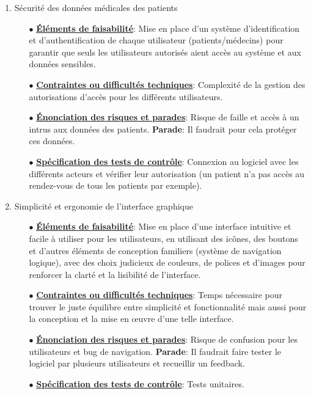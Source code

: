 \documentclass[a4paper]{book}
\begin{document}
\begin{enumerate}
    \item Sécurité des données médicales des patients\newline
    \begin{itemize}
        \item[$\bullet$] \textbf{\underline{Éléments de faisabilité}}: Mise en place d’un système d’identification et d’authentification de chaque utilisateur (patients/médecins) pour garantir que seuls les utilisateurs autorisés aient accès au système et aux données sensibles.
        \item[$\bullet$] \textbf{\underline{Contraintes ou difficultés techniques}}: Complexité de la gestion des autorisations d'accès pour les différents utilisateurs.
        \item[$\bullet$] \textbf{\underline{Énonciation des risques et parades}}: Risque de faille et accès à un intrus aux données des patients.\newline
        \textbf{Parade}: Il faudrait pour cela protéger ces données.
        \item[$\bullet$] \textbf{\underline{Spécification des tests de contrôle}}: Connexion au logiciel avec les différents acteurs et vérifier leur autorisation (un patient n’a pas accès au rendez-vous de tous les patients par exemple). \newline
    \end{itemize}

\item Simplicité et ergonomie de l’interface graphique\newline
\begin{itemize}
    \item[$\bullet$] \textbf{\underline{Éléments de faisabilité}}: Mise en place d’une interface intuitive et facile à utiliser pour les utilisateurs, 
    en utilisant des icônes, des boutons et d'autres éléments de conception familiers (système de navigation logique), avec des choix judicieux de couleurs, 
    de polices et d’images pour renforcer la clarté et la lisibilité de l'interface.
    \item[$\bullet$] \textbf{\underline{Contraintes ou difficultés techniques}}: Temps nécessaire pour trouver le juste équilibre entre simplicité et fonctionnalité 
    mais aussi pour la conception et la mise en œuvre d’une telle interface.
    \item[$\bullet$] \textbf{\underline{Énonciation des risques et parades}}: Risque de confusion pour les utilisateurs et bug de navigation.\newline
    \textbf{Parade}: Il faudrait faire tester le logiciel par plusieurs utilisateurs et recueillir un feedback.
    \item[$\bullet$] \textbf{\underline{Spécification des tests de contrôle}}: Tests unitaires.	\newline
\end{itemize}


\end{enumerate}
\end{document}
